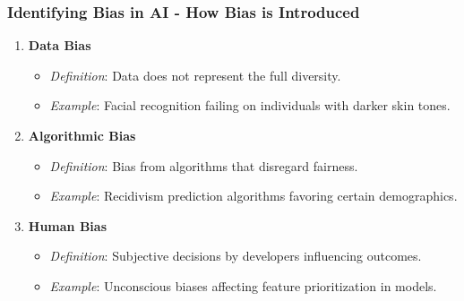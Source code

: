 \documentclass{beamer}
\begin{document}
\begin{frame}[fragile]
    \frametitle{Identifying Bias in AI - How Bias is Introduced}
    \begin{enumerate}
        \item \textbf{Data Bias}  
            \begin{itemize}
                \item \textit{Definition}: Data does not represent the full diversity.
                \item \textit{Example}: Facial recognition failing on individuals with darker skin tones.
            \end{itemize}
        \item \textbf{Algorithmic Bias}  
            \begin{itemize}
                \item \textit{Definition}: Bias from algorithms that disregard fairness.
                \item \textit{Example}: Recidivism prediction algorithms favoring certain demographics.
            \end{itemize}
        \item \textbf{Human Bias}  
            \begin{itemize}
                \item \textit{Definition}: Subjective decisions by developers influencing outcomes.
                \item \textit{Example}: Unconscious biases affecting feature prioritization in models.
            \end{itemize}
    \end{enumerate}
\end{frame}
\end{document}
